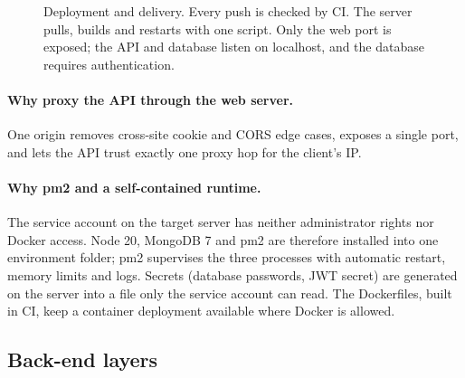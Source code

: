 \documentclass[manuscript,screen,review]{acmart}
\begin{document}
\begin{figure}[H]
{}
\caption{Deployment and delivery. Every push is checked by CI. The server pulls, builds and restarts with one script. Only the web port is exposed; the API and database listen on localhost, and the database requires authentication.}
\label{fig:deploy}
\end{figure}

\paragraph{Why proxy the API through the web server.} One origin removes cross-site cookie and CORS edge cases, exposes a single port, and lets the API trust exactly one proxy hop for the client's IP. \paragraph{Why pm2 and a self-contained runtime.} The service account on the target server has neither administrator rights nor Docker access. Node 20, MongoDB 7 and pm2 are therefore installed into one environment folder; pm2 supervises the three processes with automatic restart, memory limits and logs. Secrets (database passwords, JWT secret) are generated on the server into a file only the service account can read. The Dockerfiles, built in CI, keep a container deployment available where Docker is allowed.

\subsection{Back-end layers}
\end{document}
